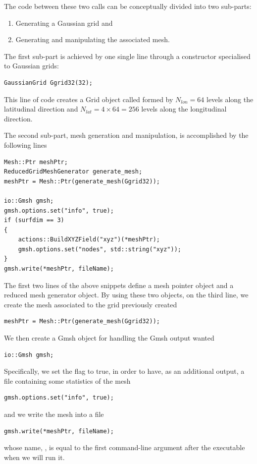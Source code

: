 The code between these two calls can be conceptually divided into two 
sub-parts: 
%
\begin{enumerate}
\item Generating a Gaussian grid and
\item Generating and manipulating the associated mesh.
\end{enumerate}
%
The first sub-part is achieved by one single line through a constructor 
specialised to Gaussian grids:
%
\begin{lstlisting}[style=CStyleNoLine]
GaussianGrid Ggrid32(32);
\end{lstlisting}
%
This line of code creates a Grid object called  formed 
by $N_{lon} = 64$ levels along the latitudinal direction and $N_{lat} 
= 4 \times 64 = 256$ levels along the longitudinal direction.

The second sub-part, mesh generation and manipulation, is accomplished 
by the following lines 
%
\begin{lstlisting}[style=CStyleNoLine]
Mesh::Ptr meshPtr;
ReducedGridMeshGenerator generate_mesh;
meshPtr = Mesh::Ptr(generate_mesh(Ggrid32));
 
io::Gmsh gmsh;
gmsh.options.set("info", true);
if (surfdim == 3)
{
    actions::BuildXYZField("xyz")(*meshPtr);
    gmsh.options.set("nodes", std::string("xyz"));
}
gmsh.write(*meshPtr, fileName);
\end{lstlisting}
%
The first two lines of the above snippets define a mesh pointer object 
and a reduced mesh generator object. By using these two objects, on the 
third line, we create the mesh associated to the grid previously created
%
\begin{lstlisting}[style=CStyleNoLine]
meshPtr = Mesh::Ptr(generate_mesh(Ggrid32));
\end{lstlisting}
%
We then create a Gmsh object for handling the Gmsh output wanted
%
\begin{lstlisting}[style=CStyleNoLine]
io::Gmsh gmsh;
\end{lstlisting}
%
Specifically, we set the flag  to true, in order to 
have, as an additional output, a file containing some statistics 
of the mesh
%
\begin{lstlisting}[style=CStyleNoLine]
gmsh.options.set("info", true);
\end{lstlisting}
%
and we write the mesh into a file
%
\begin{lstlisting}[style=CStyleNoLine]
gmsh.write(*meshPtr, fileName);
\end{lstlisting}
%
whose name, , is equal to the first command-line 
argument after the executable when we will run it.

